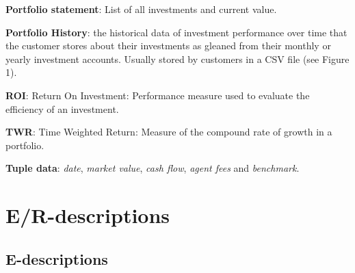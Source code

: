 \documentclass[runningheads,12pt]{article}
\begin{document}
\noindent\textbf{Portfolio statement}: List of all investments and current value.\smallskip

\noindent\textbf{Portfolio History}: the historical data of investment performance over time that the customer stores about their investments as gleaned from their monthly or yearly investment accounts. Usually stored by customers in a CSV file (see Figure 1).\smallskip

\noindent\textbf{ROI}: Return On Investment: Performance measure used to evaluate the efficiency of an investment.\smallskip

\noindent\textbf{TWR}: Time Weighted Return: Measure of the compound rate of growth in a portfolio.\smallskip

\noindent\textbf{Tuple data}: \textit{date}, \textit{market value}, \textit{cash flow}, \textit{agent fees} and \textit{benchmark}.\smallskip

\section{E/R-descriptions}

\subsection{E-descriptions}
\end{document}
